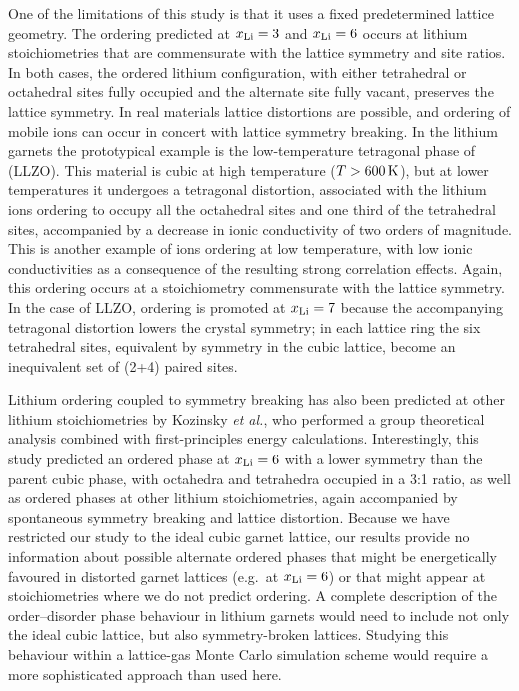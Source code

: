 \documentclass[aps,prb,twocolumn,superscriptaddress,reprint]{revtex4-1}
\newcommand{\xLi}{x_\m{Li}}
\begin{document}
One of the limitations of this study is that it uses a fixed predetermined lattice geometry. The ordering predicted at $\xLi=3$ and $\xLi=6$ occurs at  lithium stoichiometries that are commensurate with the lattice symmetry and site ratios. In both cases, the ordered lithium configuration, with either tetrahedral or octahedral sites fully occupied and the alternate site fully vacant, preserves the lattice symmetry. In real materials lattice distortions are possible, and ordering of mobile ions can occur in concert with lattice symmetry breaking. In the lithium garnets the prototypical example is the low-temperature tetragonal phase of  (LLZO).\cite{BernsteinEtAl_PhysRevLett2012,AwakaEtAl_ChemLett2011} This material is cubic at high temperature ($T>600\,\mathrm{K}$), but at lower temperatures it undergoes a tetragonal distortion, associated with the lithium ions ordering to occupy all the octahedral sites and one third of the tetrahedral sites, accompanied by a decrease in ionic conductivity of two orders of magnitude. This is another example of ions ordering at low temperature, with low ionic conductivities as a consequence of the resulting strong correlation effects.\cite{BurbanoEtAl_PhysRevLett2016} Again, this ordering occurs at a stoichiometry  commensurate with the lattice symmetry. In the case of LLZO, ordering is promoted at $\xLi=7$ because the accompanying tetragonal distortion lowers the crystal symmetry; in each lattice ring the six tetrahedral sites, equivalent by symmetry in the cubic lattice, become an inequivalent set of (2+4) paired sites. 

Lithium ordering coupled to symmetry breaking has also been predicted at other lithium stoichiometries by Kozinsky \emph{et al.},\cite{KozinskyEtAl_PhysRevLett2016} who performed a group theoretical analysis combined with first-principles energy calculations. Interestingly, this study predicted an ordered phase at $\xLi=6$ with a lower symmetry than the parent cubic phase, with octahedra and tetrahedra occupied in a 3:1 ratio, as well as ordered phases at other lithium stoichiometries, again accompanied by spontaneous symmetry breaking and lattice distortion. Because we have restricted our study to the ideal cubic garnet lattice, our results provide no information about possible alternate ordered phases that might be  energetically favoured in distorted garnet lattices (e.g.\ at $\xLi=6$) or that might appear at stoichiometries where we do not predict ordering. A complete description of the order--disorder phase behaviour in lithium garnets would need to include not only the ideal cubic lattice, but also symmetry-broken lattices. Studying this behaviour within a lattice-gas Monte Carlo simulation scheme would require a more sophisticated approach than used here.
\end{document}
